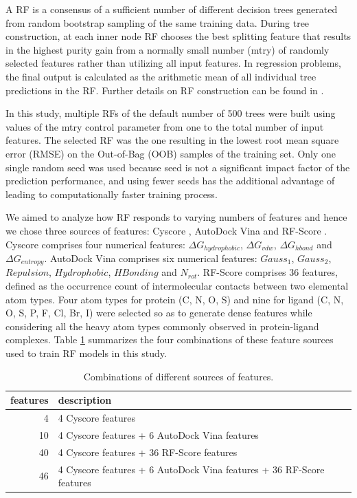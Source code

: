 \documentclass[journal=jacsat,manuscript=article]{achemso}
\begin{document}
A RF \cite{1309} is a consensus of a sufficient number of different decision trees generated from random bootstrap sampling of the same training data. During tree construction, at each inner node RF chooses the best splitting feature that results in the highest purity gain from a normally small number (mtry) of randomly selected features rather than utilizing all input features. In regression problems, the final output is calculated as the arithmetic mean of all individual tree predictions in the RF. Further details on RF construction can be found in \cite{564,1362}.

In this study, multiple RFs of the default number of 500 trees were built using values of the mtry control parameter from one to the total number of input features. The selected RF was the one resulting in the lowest root mean square error (RMSE) on the Out-of-Bag (OOB) samples of the training set. Only one single random seed was used because seed is not a significant impact factor of the prediction performance, and using fewer seeds has the additional advantage of leading to computationally faster training process.

We aimed to analyze how RF responds to varying numbers of features and hence we chose three sources of features: Cyscore \cite{1372}, AutoDock Vina \cite{595} and RF-Score \cite{564}. Cyscore comprises four numerical features: $\Delta G_{hydrophobic}$, $\Delta G_{vdw}$, $\Delta G_{hbond}$ and $\Delta G_{entropy}$. AutoDock Vina comprises six numerical features: $Gauss_1$, $Gauss_2$, $Repulsion$, $Hydrophobic$, $HBonding$ and $N_{rot}$. RF-Score comprises 36 features, defined as the occurrence count of intermolecular contacts between two elemental atom types. Four atom types for protein (C, N, O, S) and nine for ligand (C, N, O, S, P, F, Cl, Br, I) were selected so as to generate dense features while considering all the heavy atom types commonly observed in protein-ligand complexes. Table \ref{tbl:features} summarizes the four combinations of these feature sources used to train RF models in this study.

\begin{table}
\caption{Combinations of different sources of features.}
\label{tbl:features}
\begin{tabular}{rl}
\hline
features & description\\
\hline
 4 & 4 Cyscore features\\
10 & 4 Cyscore features + 6 AutoDock Vina features\\
40 & 4 Cyscore features + 36 RF-Score features\\
46 & 4 Cyscore features + 6 AutoDock Vina features + 36 RF-Score features\\
\hline
\end{tabular}
\end{table}
\end{document}
